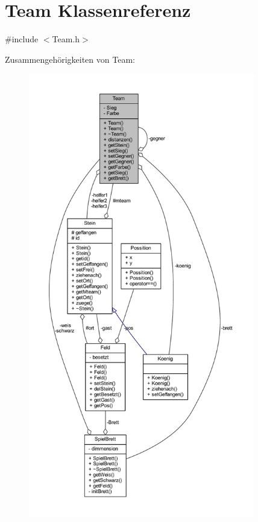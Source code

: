 \hypertarget{class_team}{}\section{Team Klassenreferenz}
\label{class_team}


{\ttfamily \#include $<$Team.\+h$>$}



Zusammengehörigkeiten von Team\+:\nopagebreak
\begin{figure}[H]
\begin{center}
\leavevmode
\includegraphics[height=550pt]{class_team__coll__graph}
\end{center}
\end{figure}
